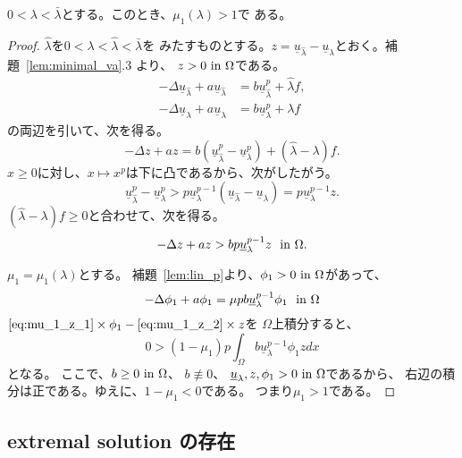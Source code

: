 \begin{lem} \label{lem:lin_1}
 $0 < \lambda < \bar{\lambda}$とする。このとき、$\mu_1(\lambda) > 1$で
 ある。
\end{lem}

\begin{proof}
 $\hat{\lambda}$を$0 < \lambda < \hat{\lambda} < \bar{\lambda}$を
 みたすものとする。$z = \underline{u}_{\hat{\lambda}} -
 \underline{u}_\lambda$とおく。補題~\ref{lem:minimal_va}.3 より、
 $z > 0 ~\text{in}~ \Omega$である。
 \begin{align*}
  -\Delta \underline{u}_{\hat{\lambda}} + a \underline{u}_{\hat{\lambda}} &= b
  \underline{u}_{\hat{\lambda}}^p + \hat{\lambda} f, \\   
  -\Delta \underline{u}_{\lambda} + a \underline{u}_\lambda &= b
  \underline{u}_\lambda^p + \lambda f
 \end{align*}
 の両辺を引いて、次を得る。
 \[
  -\Delta z + az = b (\underline{u}_{\hat{\lambda}}^p -
 \underline{u}_\lambda^p)
 + (\hat{\lambda} - \lambda) f.
 \]
 $x \geq 0$に対し、$x \mapsto x^p$は下に凸であるから、次がしたがう。
 \[
  \underline{u}_{\hat{\lambda}}^p - \underline{u}_\lambda^p > 
 p \underline{u}_\lambda^{p-1} (\underline{u}_{\hat{\lambda}} -
 \underline{u}_\lambda) = p \underline{u}_\lambda^{p-1} z.
 \]
 $(\hat{\lambda} - \lambda) f \geq 0$と合わせて、次を得る。
 \begin{equation}
  -\Delta z + az > bp \underline{u}_\lambda^{p-1} z  \ \ \text{in}~ \Omega.
   \label{eq:mu_1_z_1}
 \end{equation}

 $\mu_1 = \mu_1(\lambda)$とする。
 補題~\ref{lem:lin_p}より、$\phi_1 > 0 ~\text{in}~ \Omega$があって、
 \begin{equation}
  -\Delta \phi_1 + a \phi_1 =
   \mu p b \underline{u}_\lambda^{p-1} \phi_1  \ \ \text{in}~ \Omega
   \label{eq:mu_1_z_2}
 \end{equation}
 $ \text{\eqref{eq:mu_1_z_1}} \times \phi_1 - 
 \text{\eqref{eq:mu_1_z_2}} \times z$を
 $\Omega$上積分すると、
 \[
  0 > (1 - \mu_1) p \int_\Omega b \underline{u}_\lambda^{p-1} \phi_1 z dx
 \]
 となる。
 ここで、$b \geq 0 ~\text{in}~ \Omega$、
 $b \not \equiv 0$、
 $\underline{u}_\lambda, z, \phi_1 > 0 ~\text{in}~ \Omega$であるから、
 右辺の積分は正である。ゆえに、$1 - \mu_1 < 0$である。
 つまり$\mu_1 > 1$である。 \qedhere
\end{proof}

\subsection{extremal solution の存在}

